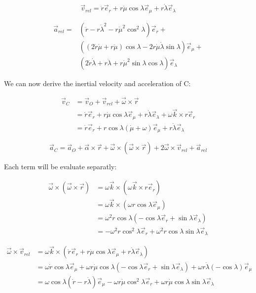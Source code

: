 \documentclass[10pt]{article}
\newcommand{\er}{\vec{e}_r}
\newcommand{\el}{\vec{e}_\lambda}
\newcommand{\eu}{\vec{e}_\mu}
\begin{document}
$$\vec{v}_{rel} = \dot{r}\er + r\dot{\mu}\cos{\lambda}\eu + r\dot{\lambda}\el$$

\begin{align*}
\vec{a}_{rel} = & (\ddot{r} - r\dot{\lambda}^2 -
                  r\dot{\mu}^2\cos^2{\lambda})\er +\\ 
                &  ((2\dot{r}\dot{\mu} + r\ddot{\mu})\cos{\lambda} -
                  2r\dot{\mu}\dot{\lambda}\sin{\lambda})\eu +\\
                &  (2\dot{r}\dot{\lambda} + r\ddot{\lambda} +
                  r\dot{\mu}^2\sin{\lambda}\cos{\lambda})\el
\end{align*}


We can now derive the inertial velocity and acceleration of C:

\begin{align*}
\vec{v}_C & = \vec{v}_O + \vec{v}_{rel} + \vec{\omega}\times\vec{r}\\
          & = \dot{r}\er + r\dot{\mu}\cos{\lambda}\eu +
              r\dot{\lambda}\el + \omega\vec{k}\times r\er\\
          & = \dot{r}\er + r\cos{\lambda}(\dot{\mu} + \omega)\eu 
              + r\dot{\lambda}\el 
\end{align*}

$$\vec{a}_C = \vec{a}_O + \vec{\alpha}\times\vec{r} +
              \vec{\omega}\times(\vec{\omega}\times\vec{r})
              +2\vec{\omega}\times\vec{v}_{rel} + \vec{a}_{rel}$$

Each term will be evaluate separatly:

\begin{align*}
\vec{\omega}\times(\vec{\omega}\times\vec{r}) & =
      \omega\vec{k}\times(\omega\vec{k}\times r\er)\\
    & = \omega\vec{k}\times(\omega r\cos{\lambda}\eu)\\
    & = \omega^2r\cos{\lambda}(-\cos{\lambda}\er+\sin{\lambda}\el)\\
    & = -\omega^2r\cos^2{\lambda}\er + \omega^2r\cos{\lambda}\sin{\lambda}\el
\end{align*}

\begin{align*}
\vec{\omega}\times\vec{v}_{rel} & = \omega\vec{k}\times(\dot{r}\er +
    r\dot{\mu}\cos{\lambda}\eu + r\dot{\lambda}\el)\\
 & = \omega\dot{r}\cos{\lambda}\eu + \omega
     r\dot{\mu}\cos{\lambda}(-\cos{\lambda}\er + \sin{\lambda}\el) +
     \omega r\dot{\lambda}(-\cos{\lambda})\eu\\
 & = \omega\cos{\lambda}(\dot{r}-r\dot{\lambda})\eu - \omega
 r\dot{\mu}\cos^2{\lambda}\er + \omega r\dot{\mu}\cos{\lambda}\sin{\lambda}\el
\end{align*}
\end{document}
